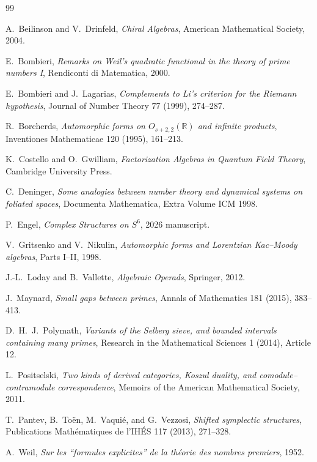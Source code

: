\documentclass[11pt]{article}
\theoremstyle{definition}
\theoremstyle{remark}
\newcommand{\1}{\mathbf 1}
\begin{document}
\begin{thebibliography}{99}

A.~Beilinson and V.~Drinfeld,
\emph{Chiral Algebras},
American Mathematical Society, 2004.

E.~Bombieri,
\emph{Remarks on Weil's quadratic functional in the theory of prime numbers I},
Rendiconti di Matematica, 2000.

E.~Bombieri and J.~Lagarias,
\emph{Complements to Li's criterion for the Riemann hypothesis},
Journal of Number Theory 77 (1999), 274--287.

R.~Borcherds,
\emph{Automorphic forms on $O_{s+2,2}(\mathbb R)$ and infinite products},
Inventiones Mathematicae 120 (1995), 161--213.

K.~Costello and O.~Gwilliam,
\emph{Factorization Algebras in Quantum Field Theory},
Cambridge University Press.

C.~Deninger,
\emph{Some analogies between number theory and dynamical systems on foliated spaces},
Documenta Mathematica, Extra Volume ICM 1998.

P.~Engel,
\emph{Complex Structures on $S^6$},
2026 manuscript.

V.~Gritsenko and V.~Nikulin,
\emph{Automorphic forms and Lorentzian Kac--Moody algebras},
Parts I--II, 1998.

J.-L.~Loday and B.~Vallette,
\emph{Algebraic Operads},
Springer, 2012.

J.~Maynard,
\emph{Small gaps between primes},
Annals of Mathematics 181 (2015), 383--413.

D.~H.~J.~Polymath,
\emph{Variants of the Selberg sieve, and bounded intervals containing many primes},
Research in the Mathematical Sciences 1 (2014), Article 12.

L.~Positselski,
\emph{Two kinds of derived categories, Koszul duality, and comodule--contramodule correspondence},
Memoirs of the American Mathematical Society, 2011.

T.~Pantev, B.~To\"en, M.~Vaqui\'e, and G.~Vezzosi,
\emph{Shifted symplectic structures},
Publications Math\'ematiques de l'IH\'ES 117 (2013), 271--328.

A.~Weil,
\emph{Sur les ``formules explicites'' de la th\'eorie des nombres premiers},
1952.


\end{thebibliography}
\end{document}
